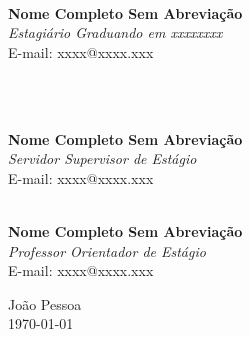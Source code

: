 \documentclass{tcc}
\begin{document}
\vspace{1.5cm}

\begin{center}    
\begin{minipage}[t]{0.4\textwidth}
    \hrulefill \\
    \centering
    \textbf{Nome Completo Sem Abreviação} \\
    \textit{Estagiário Graduando em xxxxxxxx} \\
    E-mail: xxxx@xxxx.xxx \\
    \vspace{3cm}
\end{minipage}
\hfill
\\
\begin{minipage}[t]{0.4\textwidth}
    \hrulefill \\
    \centering
    \textbf{Nome Completo Sem Abreviação} \\
    \textit{Servidor Supervisor de Estágio} \\
    E-mail: xxxx@xxxx.xxx \\
    \vspace{3cm}
\end{minipage}


\begin{minipage}[t]{0.4\textwidth}
    \hrulefill \\
    \centering
    \textbf{Nome Completo Sem Abreviação} \\
    \textit{Professor Orientador de Estágio} \\
    E-mail: xxxx@xxxx.xxx \\
    \vspace{3cm}
\end{minipage}
\end{center}

\vfill

\begin{center}
    João Pessoa \\
    \today
\end{center}


\newpage


\newpage


% 



\pagestyle{plain} %
\tableofcontents

\newpage

\newpage

\newpage

\newpage
{} %
\printbibliography[title = {REFERÊNCIAS}]
\end{document}
